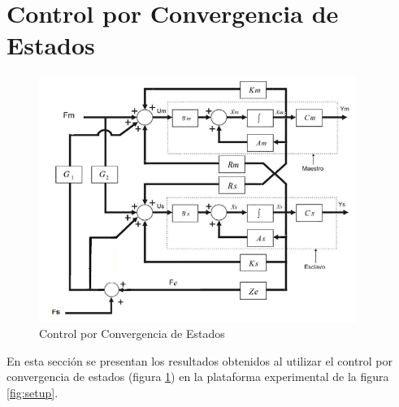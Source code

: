 \section{Control por Convergencia de Estados}
\label{sec:convergencia}
\begin{figure}[htbp]
\centering
	\includegraphics[height=8cm]{converge}
	\caption{Control por Convergencia de Estados}
  	\label{fig:converge}
\end{figure}
En esta sección se presentan los resultados obtenidos al utilizar el control por convergencia de estados (figura \ref{fig:converge}) en la plataforma experimental de la figura \ref{fig:setup}.
